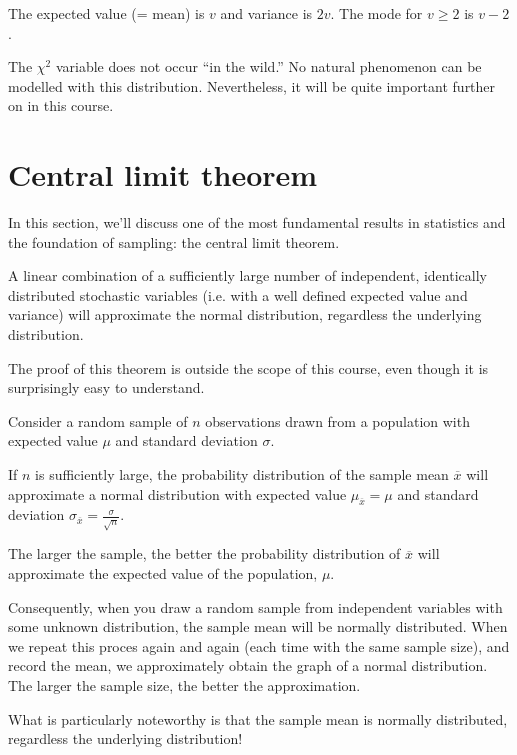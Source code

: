 The expected value (= mean) is $v$ and variance is $2v$. The mode for $v \geq 2$ is $v-2$.

The $\chi^{2}$ variable does not occur ``in the wild.'' No natural phenomenon can be modelled with this distribution. Nevertheless, it will be quite important further on in this course.

\section{Central limit theorem}
\label{sec:central-limit-theorem}

In this section, we'll discuss one of the most fundamental results in statistics and the foundation of sampling: the central limit theorem.

\begin{theorem}
  A linear combination of a sufficiently large number of independent, identically distributed stochastic variables (i.e. with a well defined expected value and variance) will approximate the normal distribution, regardless the underlying distribution.
\end{theorem}

The proof of this theorem is outside the scope of this course, even though it is surprisingly easy to understand.

\begin{theorem}
  Consider a random sample of $n$ observations drawn from a population with expected value $\mu$ and standard deviation $\sigma$.
  
  If $n$ is sufficiently large, the probability distribution of the sample mean $\overline{x}$ will approximate a normal distribution with expected value $\mu_{\overline{x}} = \mu$ and standard deviation $\sigma_{\overline{x}} = \frac{\sigma}{\sqrt{n}}$.
  
  The larger the sample, the better the probability distribution of $\overline{x}$ will approximate the expected value of the population, $\mu$.
\end{theorem}

Consequently, when you draw a random sample from independent variables with some unknown distribution, the sample mean will be normally distributed. When we repeat this proces again and again (each time with the same sample size), and record the mean, we approximately obtain the graph of a normal distribution. The larger the sample size, the better the approximation.

What is particularly noteworthy is that the sample mean is normally distributed, regardless the underlying distribution!

